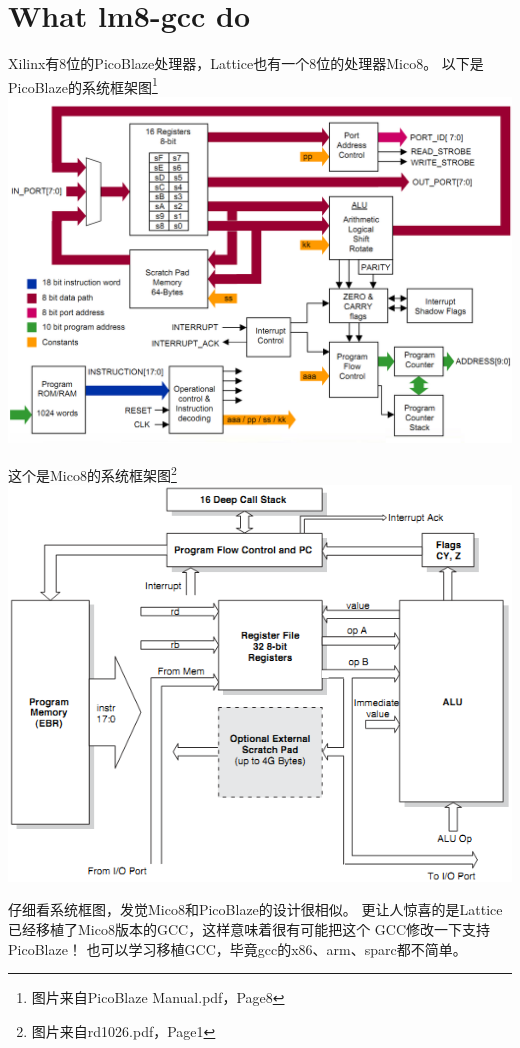 \chapter{What lm8-gcc do}
Xilinx有8位的PicoBlaze处理器，Lattice也有一个8位的处理器Mico8。
以下是PicoBlaze的系统框架图\footnote{图片来自PicoBlaze Manual.pdf，Page8} \\
\includegraphics[width=\textwidth]{pb8arch}

这个是Mico8的系统框架图\footnote{图片来自rd1026.pdf，Page1} \\
\includegraphics[width=\textwidth]{lm8arch}

仔细看系统框图，发觉Mico8和PicoBlaze的设计很相似。
更让人惊喜的是Lattice已经移植了Mico8版本的GCC，这样意味着很有可能把这个
GCC修改一下支持PicoBlaze！
也可以学习移植GCC，毕竟gcc的x86、arm、sparc都不简单。

